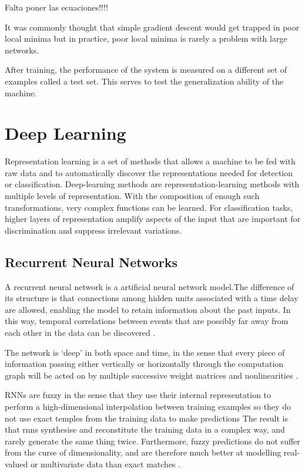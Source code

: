 Falta poner las ecuaciones!!!!

It was commonly thought that simple gradient descent would get trapped in poor local minima but in practice, poor local minima is rarely a problem with large networks.\cite{lecun2015deep}


After training, the performance of the system is measured on a different set of examples called a test set. This serves to test the generalization ability of the machine\cite{lecun2015deep}.

\section{Deep Learning}
Representation learning is a set of methods that allows a machine to be fed with raw data and to automatically discover the representations needed for detection or classification. Deep-learning methods are representation-learning methods with multiple levels of representation. With the composition of enough such transformations, very complex functions can be learned. For classification tasks, higher layers of representation amplify aspects of the input that are important for discrimination and suppress irrelevant variations\cite{lecun2015deep}.


\subsection{Recurrent Neural Networks}
A recurrent neural network is a artificial neural network model.The difference of its structure is that connections among hidden units associated with a time delay are allowed, enabling the model to retain information about the past inputs. In this way, temporal correlations between events that are possibly far away from each other in the data can be discovered \cite{pascanu2013difficulty}. 

The network is `deep' in both space and time, in the sense that every piece of information passing either vertically or horizontally through the computation graph will be acted on by multiple successive weight matrices and nonlinearities \cite{graves2013generating}.

RNNs are fuzzy in the sense that they use their internal representation to perform a high-dimensional interpolation between training examples so they do not use exact temples from the training data to make predictions \cite{graves2013generating}
The result is that rnns synthesise and reconstitute the training data in a complex way, and rarely generate the same thing twice. Furthermore, fuzzy predictions do not suffer from the curse of dimensionality, and are therefore much better at modelling real-valued or multivariate data than exact matches  \cite{graves2013generating}.

